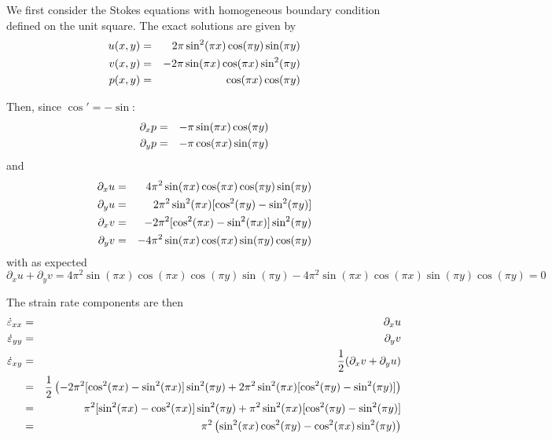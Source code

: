 We first consider the Stokes equations with homogeneous boundary condition
defined on the unit square. The exact solutions are given by
\begin{eqnarray}
u(x,y) &=& 2\pi \sin^2(\pi x)  \cos(\pi y) \sin(\pi y) \nonumber\\
v(x,y) &=& -2\pi \sin(\pi x) \cos(\pi x) \sin^2(\pi y)  \nonumber\\
p(x,y) &=& \cos(\pi x) \cos(\pi y)
\end{eqnarray}

Then, since $\cos' = -\sin$:
\begin{eqnarray}
\partial_x p &=& -\pi \sin(\pi x) \cos(\pi y) \nonumber\\
\partial_y p &=& -\pi \cos(\pi x) \sin(\pi y) \nonumber
\end{eqnarray}
and 
\begin{eqnarray}
\partial_x u &=& 4\pi^2 \sin(\pi x) \cos(\pi x) \cos(\pi y) \sin(\pi y)  \nonumber\\
\partial_y u &=& 2\pi^2 \sin^2(\pi x) [\cos^2(\pi y) - \sin^2(\pi y) ] \nonumber\\
\partial_x v &=& -2\pi^2 [ \cos^2(\pi x) - \sin^2(\pi x)] \sin^2(\pi y)  \nonumber\\
\partial_y v &=& -4\pi^2 \sin(\pi x) \cos(\pi x) \sin(\pi y) \cos(\pi y)  \nonumber
\end{eqnarray}
with as expected
\[
\partial_x u + \partial_y v 
= 
4\pi^2 \sin(\pi x) \cos(\pi x) \cos(\pi y) \sin(\pi y)
-
4\pi^2 \sin(\pi x) \cos(\pi x) \sin(\pi y) \cos(\pi y)
=0
\]

The strain rate components are then 
\begin{eqnarray}
\dot\varepsilon_{xx} &=& \partial_x u \nonumber\\
\dot\varepsilon_{yy} &=& \partial_y v \nonumber\\
\dot\varepsilon_{xy} 
&=& \frac12 (\partial_x v + \partial_y u) \nonumber\\
&=& \frac12 \left(-2\pi^2 [ \cos^2(\pi x) - \sin^2(\pi x)] \sin^2(\pi y) +2\pi^2 \sin^2(\pi x) [\cos^2(\pi y) - \sin^2(\pi y) ] \right) \nonumber\\
&=& \pi^2 [ \sin^2(\pi x) - \cos^2(\pi x)] \sin^2(\pi y) + \pi^2 \sin^2(\pi x) [\cos^2(\pi y) - \sin^2(\pi y) ] \nonumber\\
&=& \pi^2 \left( \sin^2(\pi x) \cos^2(\pi y) - \cos^2(\pi x) \sin^2(\pi y)  \right) \nonumber
\end{eqnarray}

